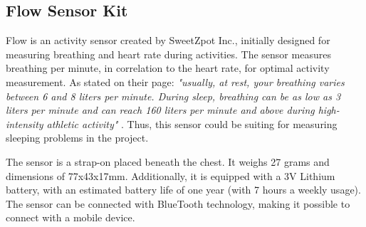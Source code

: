 


\subsection{Flow Sensor Kit}
Flow is an activity sensor created by SweetZpot Inc., initially designed for measuring breathing and heart rate during activities. The sensor measures breathing per minute, in correlation to the heart rate, for optimal activity measurement. As stated on their page: \textit{"usually, at rest, your breathing varies between 6 and 8 liters per minute. During sleep, breathing can be as low as 3 liters per minute and can reach 160 liters per minute and above during high-intensity athletic activity"} \cite{flow}. Thus, this sensor could be suiting for measuring sleeping problems in the project.

The sensor is a  strap-on placed beneath the chest. It weighs 27 grams and dimensions of 77x43x17mm. Additionally, it is equipped with a 3V Lithium battery, with an estimated battery life of one year (with 7 hours a weekly usage). The sensor can be connected with BlueTooth technology, making it possible to connect with a mobile device.
